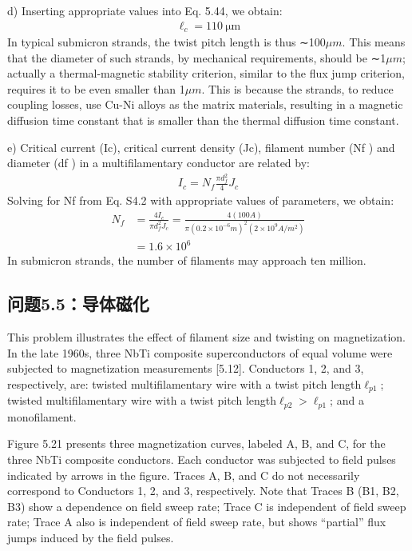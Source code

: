 d) Inserting appropriate values into Eq. 5.44, we obtain:
\begin{align*}%
\ell_{c}=110\ \mathrm{\mu m}
\end{align*}
In typical submicron strands, the twist pitch length is thus ∼100$\mu m$. This means
that the diameter of such strands, by mechanical requirements, should be ∼1$\mu m$;
actually a thermal-magnetic stability criterion, similar to the flux jump criterion,
requires it to be even smaller than 1$\mu m$. This is because the strands, to reduce
coupling losses, use Cu-Ni alloys as the matrix materials, resulting in a magnetic
diffusion time constant that is smaller than the thermal diffusion time constant.

e) Critical current (Ic), critical current density (Jc), filament number (Nf ) and
diameter (df ) in a multifilamentary conductor are related by:
\begin{align*}%
I_c=N_f\frac{\pi d_f^2}{4} J_c \tag{S4.2}
\end{align*}
Solving for Nf from Eq. S4.2 with appropriate values of parameters, we obtain:
\begin{align*}%
N_{f}&=\frac{4I_{c}}{\pi d_{f}^{2}J_{c}}=\frac{4(100A)}{\pi(0.2\times10^{-6}m)^{2}(2\times10^{9}A/m^{2})}\\
&=1.6\times 10^{6}
\end{align*}
In submicron strands, the number of filaments may approach ten million.



\subsection{问题5.5：导体磁化}
This problem illustrates the effect of filament size and twisting on magnetization.
In the late 1960s, three NbTi composite superconductors of equal volume were
subjected to magnetization measurements [5.12]. Conductors 1, 2, and 3, respectively,
are: twisted multifilamentary wire with a twist pitch length$\ell_{p1}$; twisted
multifilamentary wire with a twist pitch length$\ell_{p2}>\ell_{p1}$; and a monofilament.


Figure 5.21 presents three magnetization curves, labeled A, B, and C, for the
three NbTi composite conductors. Each conductor was subjected to field pulses
indicated by arrows in the figure. Traces A, B, and C do not necessarily correspond
to Conductors 1, 2, and 3, respectively. Note that Traces B (B1, B2, B3) show a
dependence on field sweep rate; Trace C is independent of field sweep rate; Trace
A also is independent of field sweep rate, but shows “partial” flux jumps induced
by the field pulses.

